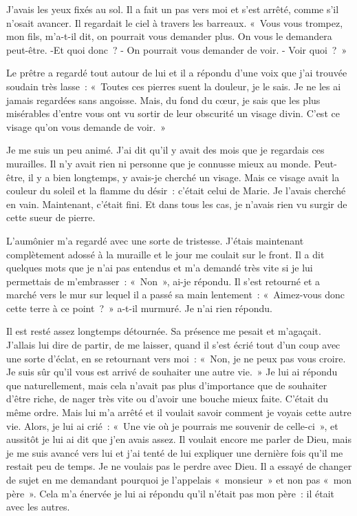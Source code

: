 \documentclass[french,twoside]{book} %
\begin{document}
J'avais les yeux fixés au sol. Il a fait un pas vers moi et s’est arrêté, comme s’il n’osait avancer. Il regardait le ciel à travers les barreaux. « Vous vous trompez, mon fils, m’a-t-il dit, on pourrait vous demander plus. On vous le demandera peut-être. -Et quoi donc ? - On pourrait vous demander de voir. - Voir quoi ? »\par
Le prêtre a regardé tout autour de lui et il a répondu d’une voix que j’ai trouvée soudain très lasse : « Toutes ces pierres suent la douleur, je le sais. Je ne les ai jamais regardées sans angoisse. Mais, du fond du cœur, je sais que les plus misérables d’entre vous ont vu sortir de leur obscurité un visage divin. C'est ce visage qu’on vous demande de voir. »\par
Je me suis un peu animé. J'ai dit qu’il y avait des mois que je regardais ces murailles. Il n’y avait rien ni personne que je connusse mieux au monde. Peut-être, il y a bien longtemps, y avais-je cherché un visage. Mais ce visage avait la couleur du soleil et la flamme du désir : c’était celui de Marie. Je l’avais cherché en vain. Maintenant, c’était fini. Et dans tous les cas, je n’avais rien vu surgir de cette sueur de pierre.\par
L'aumônier m’a regardé avec une sorte de tristesse. J'étais maintenant complètement adossé à la muraille et le jour me coulait sur le front. Il a dit quelques mots que je n’ai pas entendus et m’a demandé très vite si je lui permettais de m’embrasser : « Non », ai-je répondu. Il s’est retourné et a marché vers le mur sur lequel il a passé sa main lentement : « Aimez-vous donc cette terre à ce point ? » a-t-il murmuré. Je n’ai rien répondu.\par
Il est resté assez longtemps détournée. Sa présence me pesait et m’agaçait. J'allais lui dire de partir, de me laisser, quand il s’est écrié tout d’un coup avec une sorte d’éclat, en se retournant vers moi : « Non, je ne peux pas vous croire. Je suis sûr qu’il vous est arrivé de souhaiter une autre vie. » Je lui ai répondu que naturellement, mais cela n’avait pas plus d’importance que de souhaiter d’être riche, de nager très vite ou d’avoir une bouche mieux faite. C'était du même ordre. Mais lui m’a arrêté et il voulait savoir comment je voyais cette autre vie. Alors, je lui ai crié : « Une vie où je pourrais me souvenir de celle-ci », et aussitôt je lui ai dit que j’en avais assez. Il voulait encore me parler de Dieu, mais je me suis avancé vers lui et j’ai tenté de lui expliquer une dernière fois qu’il me restait peu de temps. Je ne voulais pas le perdre avec Dieu. Il a essayé de changer de sujet en me demandant pourquoi je l’appelais « monsieur » et non pas « mon père ». Cela m’a énervée je lui ai répondu qu’il n’était pas mon père : il était avec les autres.\par
\end{document}
